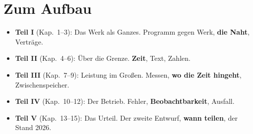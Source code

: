 \section*{Zum Aufbau}

\begin{itemize}
\item \textbf{Teil I} (Kap.\ 1--3): Das Werk als Ganzes. Programm gegen Werk, \textbf{die Naht}, Verträge.
\item \textbf{Teil II} (Kap.\ 4--6): Über die Grenze. \textbf{Zeit}, Text, Zahlen.
\item \textbf{Teil III} (Kap.\ 7--9): Leistung im Großen. Messen, \textbf{wo die Zeit hingeht}, Zwischenspeicher.
\item \textbf{Teil IV} (Kap.\ 10--12): Der Betrieb. Fehler, \textbf{Beobachtbarkeit}, Ausfall.
\item \textbf{Teil V} (Kap.\ 13--15): Das Urteil. Der zweite Entwurf, \textbf{wann teilen}, der Stand 2026.
\end{itemize}

